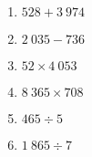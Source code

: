 
\begin{multicols}{3}
	\begin{enumerate}[itemsep=1em]
		\item $528+3~974$
		\item $2~035-736$
		\item $52\times4~053$
		\item $8~365 \times 708$
		\item $465 \div 5$
		\item $1~865\div 7$
	\end{enumerate}
\end{multicols}
